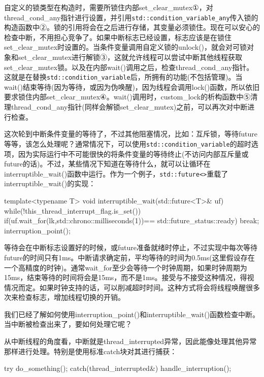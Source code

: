 自定义的锁类型在构造时，需要所锁住内部set\_clear\_mutex①，对thread\_cond\_any指针进行设置，并引用\texttt{std::condition\_variable\_any}传入锁的构造函数中②。锁的引用将会在之后进行存储，其变量必须锁住。现在可以安心的检查中断，不用担心竞争了。如果中断标志已经设置，标志应该是在锁住set\_clear\_mutex时设置的。当条件变量调用自定义锁的unlock()，就会对可锁对象和set\_clear\_mutex进行解锁③，这就允许线程可以尝试中断其他线程获取set\_clear\_mutex锁。以及在内部wait()调用之后，检查thread\_cond\_any指针。这就是在替换\texttt{std::condition\_variable}后，所拥有的功能(不包括管理)。当wait()结束等待(因为等待，或因为伪唤醒)，因为线程会调用lock()函数，所以依旧要求锁住内部set\_clear\_mutex④。wait()调用时，custom\_lock的析构函数中⑤清理thread\_cond\_any指针(同样会解锁set\_clear\_mutex)之前，可以再次对中断进行检查。


这次轮到中断条件变量的等待了，不过其他阻塞情况，比如：互斥锁，等待future等等，该怎么处理呢？通常情况下，可以使用\texttt{std::condition\_variable}的超时选项，因为实际运行中不可能很快的将条件变量的等待终止(不访问内部互斥量或future的话)。不过，某些情况下知道在等待什么，就可以让循环在interruptible\_wait()函数中运行。作为一个例子，\texttt{std::future<>}重载了interruptible\_wait()的实现：

\begin{cpp}
template<typename T>
void interruptible_wait(std::future<T>& uf)
{
  while(!this_thread_interrupt_flag.is_set())
  {
    if(uf.wait_for(lk,std::chrono::milliseconds(1))==
       std::future_status::ready)
      break;
  }
  interruption_point();
}
\end{cpp}

等待会在中断标志设置好的时候，或future准备就绪时停止，不过实现中每次等待future的时间只有1ms。中断请求确定前，平均等待的时间为0.5ms(这里假设存在一个高精度的时钟)。通常wait\_for至少会等待一个时钟周期，如果时钟周期为15ms，结束等待的时间将会是15ms，而不是1ms。接受与不接受这种情况，得视情况而定。如果时钟支持的话，可以削减超时时间。这种方式将会将线程唤醒很多次来检查标志，增加线程切换的开销。

我们已经了解如何使用interruption\_point()和interruptible\_wait()函数检查中断。当中断被检查出来了，要如何处理它呢？


从中断线程的角度看，中断就是thread\_interrupted异常，因此能像处理其他异常那样进行处理。特别是使用标准catch块对其进行捕获：

\begin{cpp}
try
{
  do_something();
}
catch(thread_interrupted&)
{
  handle_interruption();
}
\end{cpp}

